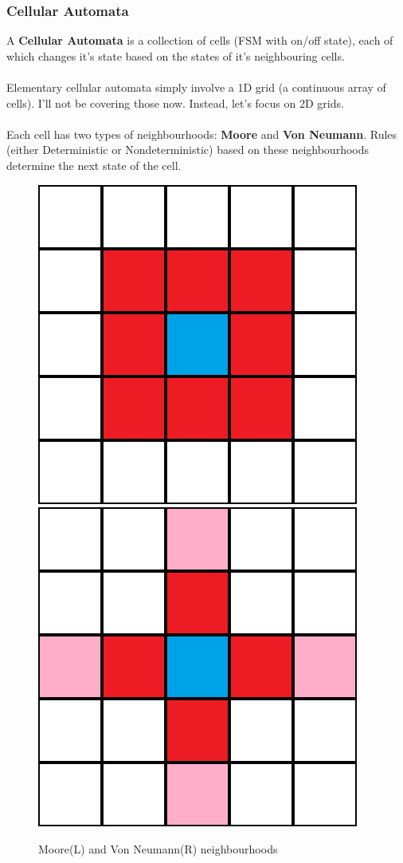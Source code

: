 \documentclass{beamer}
\begin{document}
\begin{frame}
\frametitle{Cellular Automata}
\begin{flushleft}
A \textbf{Cellular Automata} is a collection of cells (FSM with on/off state),
each of which changes it's state based on the states of it's neighbouring cells. \\~\\
\pause
Elementary cellular automata simply involve a 1D grid (a continuous array 
of cells). I'll not be covering those now. Instead, let's focus on 2D grids. \\~\\
\pause
Each cell has two types of neighbourhoods: \textbf{Moore} and \textbf{Von Neumann}. 
Rules (either Deterministic or Nondeterministic) based on these neighbourhoods 
determine the next state of the cell.
\end{flushleft}

\begin{center}
\begin{figure}
\includegraphics[scale=0.15]{img/moore_nbd}
\hspace{5em}
\includegraphics[scale=0.15]{img/vn_nbd}
\caption{Moore(L) and Von Neumann(R) neighbourhoods}
\end{figure}
\end{center}


\end{frame}
\end{document}
